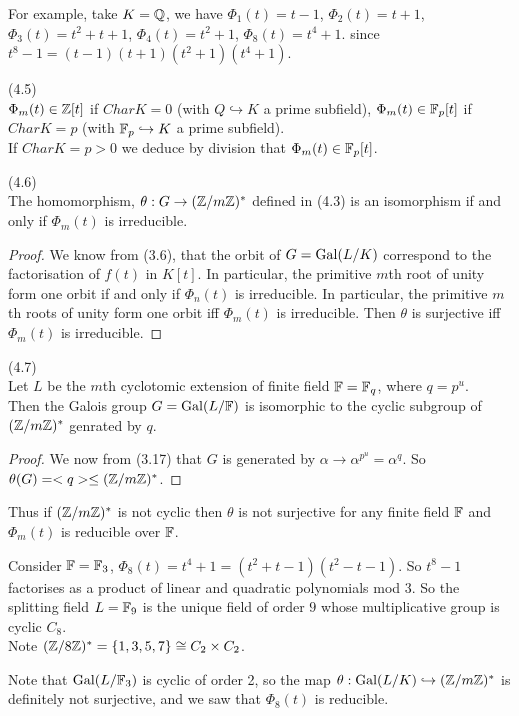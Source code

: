 \documentclass[a4paper]{article}
\begin{document}
For example, take $K=\mathbb{Q}$, we have $\Phi_1(t) = t-1$, $\Phi_2(t) = t+1$, $\Phi_3(t) = t^2+t+1$, $\Phi_4(t) = t^2+1$, $\Phi_8(t) = t^4+1$. since $t^8-1 = (t-1)(t+1)(t^2+1)(t^4+1)$.

\begin{lemma}(4.5)\\
$\Phi_m(t) \in \mathbb{Z}[t]$ if $Char K = 0$ (with $Q \hookrightarrow K$ a prime subfield), $\Phi_m(t) \in \mathbb{F}_p[t]$ if $Char K = p$ (with $\mathbb{F}_p \hookrightarrow K$ a prime subfield).\\
If $CharK = p>0$ we deduce by division that $\Phi_m(t) \in \mathbb{F}_p[t]$.
\end{lemma}

\begin{lemma} (4.6)\\
The homomorphism, $\theta: G \to (\mathbb{Z}/m\mathbb{Z})^*$ defined in (4.3) is an isomorphism if and only if $\Phi_m(t)$ is irreducible.
\begin{proof}
We know from (3.6), that the orbit of $G = \operatorname{Gal}(L/K)$ correspond to the factorisation of $f(t)$ in $K[t]$. In particular, the primitive $m$th root of unity form one orbit if and only if $\Phi_n(t)$ is irreducible. In particular, the primitive $m$th roots of unity form one orbit iff $\Phi_m(t)$ is irreducible. Then $\theta$ is surjective iff $\Phi_m(t)$ is irreducible.
\end{proof}
\end{lemma}

\begin{thm} (4.7)\\
Let $L$ be the $m$th cyclotomic extension of finite field $\mathbb{F} =\mathbb{F}_q$, where $q = p^u$.\\
Then the Galois group $G = \operatorname{Gal}(L/\mathbb{F})$ is isomorphic to the cyclic subgroup of $(\mathbb{Z}/m\mathbb{Z})^*$ genrated by $q$.
\begin{proof}
We now from (3.17) that $G$ is generated by $\alpha \to \alpha^{p^u} = \alpha^q$. So $\theta(G) = <q> \leq (\mathbb{Z}/m\mathbb{Z})^*$.
\end{proof}
\end{thm}

\begin{rem}
Thus if $(\mathbb{Z}/m\mathbb{Z})^*$ is not cyclic then $\theta$ is not surjective for any finite field $\mathbb{F}$ and $\Phi_m(t)$ is reducible over $\mathbb{F}$.
\end{rem}

\begin{eg}
Consider $\mathbb{F}=\mathbb{F}_3$, $\Phi_8(t) = t^4+1 = (t^2+t-1)(t^2-t-1)$. So $t^8-1$ factorises as a product of linear and quadratic polynomials mod $3$. So the splitting field $L=\mathbb{F}_9$ is the unique field of order $9$ whose multiplicative group is cyclic $C_8$.\\
Note $(\mathbb{Z}/8\mathbb{Z})^* = \{1,3,5,7\} \cong C_2 \times C_2$.

Note that $\operatorname{Gal}(L/\mathbb{F}_3)$ is cyclic of order 2, so the map $\theta:\operatorname{Gal}(L/K) \hookrightarrow (\mathbb{Z}/m\mathbb{Z})^*$ is definitely not surjective, and we saw that $\Phi_8(t)$ is reducible.
\end{eg}
\end{document}
